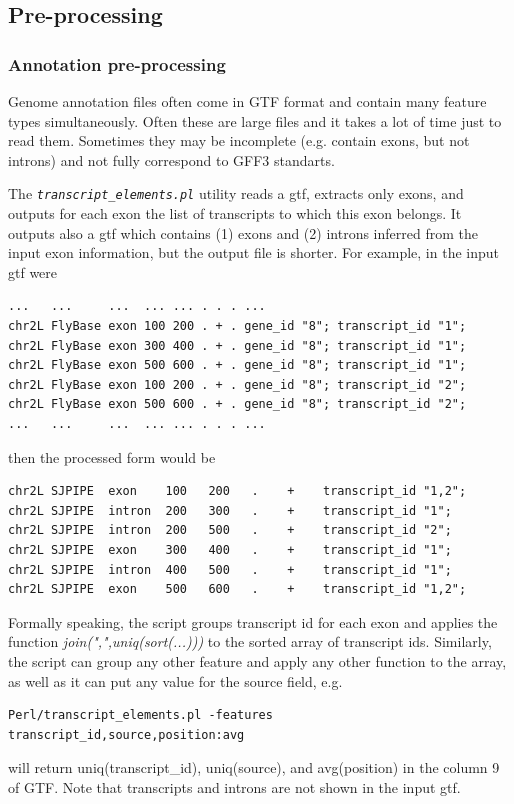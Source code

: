 \documentclass{article}
\newcommand{\prog}[1]{{\tt\em #1}}
\begin{document}

\subsection{Pre-processing}
\subsubsection{Annotation pre-processing}
\label{sec::preprocessing}
Genome annotation files often come in GTF format and contain many feature types simultaneously. Often these are large files and it takes a lot of 
time just to read them. Sometimes they may be incomplete (e.g. contain exons, but not introns) and not fully correspond to GFF3 standarts.

The \prog{transcript\_elements.pl} utility reads a gtf, extracts only exons, and outputs for each exon the list of transcripts to which this exon 
belongs. It outputs also a gtf which contains (1) exons and (2) introns inferred from the input exon information, but the output file is shorter.
For example, in the input gtf were
\begin{verbatim} 
...   ...     ...  ... ... . . . ...      
chr2L FlyBase exon 100 200 . + . gene_id "8"; transcript_id "1";
chr2L FlyBase exon 300 400 . + . gene_id "8"; transcript_id "1"; 
chr2L FlyBase exon 500 600 . + . gene_id "8"; transcript_id "1"; 
chr2L FlyBase exon 100 200 . + . gene_id "8"; transcript_id "2"; 
chr2L FlyBase exon 500 600 . + . gene_id "8"; transcript_id "2"; 
...   ...     ...  ... ... . . . ...
\end{verbatim}
then the processed form would be
\begin{verbatim} 
chr2L SJPIPE  exon    100   200   .    +    transcript_id "1,2";
chr2L SJPIPE  intron  200   300   .    +    transcript_id "1";
chr2L SJPIPE  intron  200   500   .    +    transcript_id "2";
chr2L SJPIPE  exon    300   400   .    +    transcript_id "1";
chr2L SJPIPE  intron  400   500   .    +    transcript_id "1";
chr2L SJPIPE  exon    500   600   .    +    transcript_id "1,2";
\end{verbatim}

Formally speaking, the script groups transcript id for each exon and applies the function {\em join(",",uniq(sort(...)))} to the sorted array of transcript ids. 
Similarly, the script can group any other feature and apply any other function to the array, as well as it can put any value for the source field, e.g.
\begin{verbatim}
Perl/transcript_elements.pl -features transcript_id,source,position:avg
\end{verbatim}
will return uniq(transcript\_id), uniq(source), and avg(position) in the column 9 of GTF. Note that transcripts and introns are not shown in the input gtf. 
\end{document}
